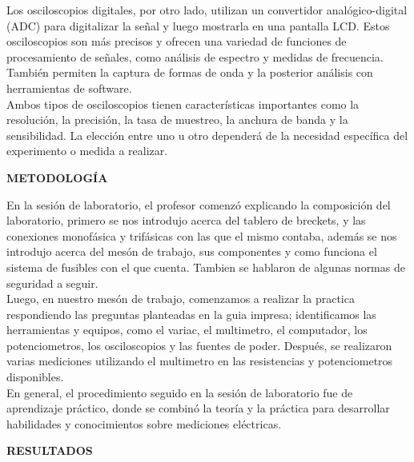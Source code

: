 \documentclass[12pt]{article}
\begin{document}
	Los osciloscopios digitales, por otro lado, utilizan un convertidor analógico-digital (ADC) para digitalizar la señal y luego mostrarla en una pantalla LCD. Estos osciloscopios son más precisos y ofrecen una variedad de funciones de procesamiento de señales, como análisis de espectro y medidas de frecuencia. También permiten la captura de formas de onda y la posterior análisis con herramientas de software.\\
	
	Ambos tipos de osciloscopios tienen características importantes como la resolución, la precisión, la tasa de muestreo, la anchura de banda y la sensibilidad. La elección entre uno u otro dependerá de la necesidad específica del experimento o medida a realizar.\\
	
	\newpage
	
	\begin{center}
		\textbf{\large METODOLOGÍA}\\
	\end{center}
	
	En la sesión de laboratorio, el profesor comenzó explicando la composición del laboratorio, primero se nos introdujo acerca del tablero de breckets, y las conexiones monofásica y trifásicas con las que el mismo contaba, además se nos introdujo acerca del mesón de trabajo, sus componentes y como funciona el sistema de fusibles con el que cuenta. Tambien se hablaron de algunas normas de seguridad a seguir.\\
	
	Luego, en nuestro mesón de trabajo, comenzamos a realizar la practica respondiendo las preguntas planteadas en la guia impresa; identificamos las herramientas y equipos, como el variac, el multimetro, el computador, los potenciometros, los osciloscopios y las fuentes de poder. Después, se realizaron varias mediciones utilizando el multimetro en las resistencias y potenciometros disponibles.\\
	
	En general, el procedimiento seguido en la sesión de laboratorio fue de aprendizaje práctico, donde se combinó la teoría y la práctica para desarrollar habilidades y conocimientos sobre mediciones eléctricas.\\
	
	\newpage
	
	\begin{center}
		\textbf{\large RESULTADOS}\\
	\end{center}
	
\end{document}
